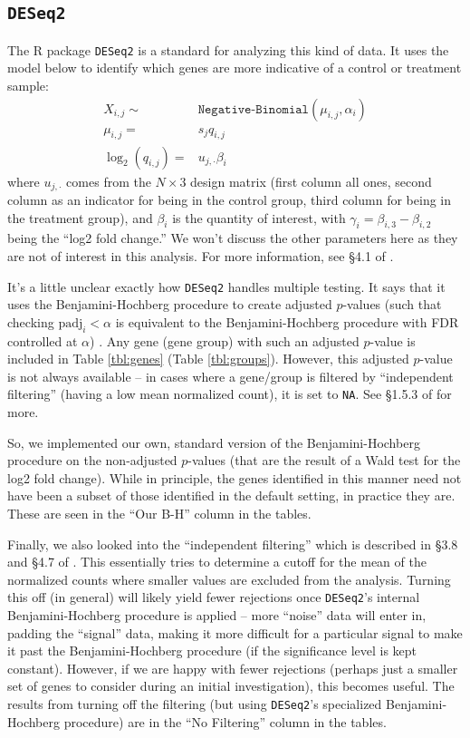 \documentclass{article}
\begin{document}
\subsection{\texttt{DESeq2}}
The R package \texttt{DESeq2} is a standard for analyzing this kind of data. It uses the model below to identify
which genes are more indicative of a control or treatment sample:
\begin{align*}
X_{i,j}\sim& \texttt{Negative-Binomial}(\mu_{i,j}, \alpha_i)\\
\mu_{i,j}=&s_jq_{i,j}\\
\log_2(q_{i,j})=&u_{j,\cdot} \beta_i
\end{align*}
where $u_{j,\cdot}$ comes from the $N\times 3$ design matrix (first column all ones, second column as an indicator
for being in the control group, third column for being in the treatment group), and $\beta_i$ is the quantity of interest,
with $\gamma_i=\beta_{i, 3}-\beta_{i,2}$ being the ``log2 fold change.'' We won't discuss the other parameters
here as they are not of interest in this analysis. For more information, see \S4.1 of \citep{deseq2}.

It's a little unclear exactly how \texttt{DESeq2} handles multiple testing. It says that it uses the Benjamini-Hochberg
procedure to create adjusted $p$-values (such that checking $\textrm{padj}_i<\alpha$ is equivalent to the
Benjamini-Hochberg procedure with FDR controlled at $\alpha$) \citep{benjamini1995controlling}. 
Any gene (gene group) with such an adjusted $p$-value is included in Table \ref{tbl:genes} (Table \ref{tbl:groups}).
However, this 
adjusted $p$-value is not always available -- in cases where a gene/group is filtered by ``independent filtering'' (having a low
mean normalized count),
it is set to \texttt{NA}. See \S1.5.3 of \citep{deseq2} for more.

So, we implemented our own, standard version of the Benjamini-Hochberg procedure
on the non-adjusted $p$-values (that are the result of a Wald test for the log2 fold change). While in principle,
the genes identified in this manner need not have been a subset of those identified in the default setting,
in practice they are. These are seen in the ``Our B-H'' column in the tables.

Finally, we also looked into the ``independent filtering'' which is described in \S3.8 and \S4.7 of \citep{deseq2}.
This essentially tries to determine a cutoff for the mean of the normalized counts where smaller values are
excluded from the analysis. Turning this off (in general) will likely yield fewer rejections once \texttt{DESeq2}'s 
internal Benjamini-Hochberg procedure is applied -- more ``noise'' data will enter in, padding the ``signal'' data,
making it more difficult for a particular signal to make it past the Benjamini-Hochberg procedure (if the significance
level is kept constant). However, if we are happy with fewer rejections (perhaps just a smaller set of genes
to consider during an initial investigation), this becomes useful. The results from turning off the filtering (but using
\texttt{DESeq2}'s specialized Benjamini-Hochberg procedure) are in the ``No Filtering'' column in the tables.
\end{document}

